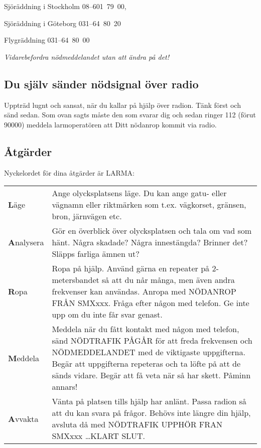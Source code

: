 Sjöräddning i Stockholm 08--601~79~00,

Sjöräddning i Göteborg 031--64~80~20

Flygräddning 031--64~80~00

\emph{Vidarebefordra nödmeddelandet utan att ändra på det!}

\subsection{Du själv sänder nödsignal över radio}

Uppträd lugnt och sansat, när du kallar på hjälp över radion. Tänk först och
sänd sedan. Som ovan sagts måste den som svarar dig och sedan ringer 112 (förut
90000) meddela larmoperatören att Ditt nödanrop kommit via radio.

\subsection{Åtgärder}

Nyckelordet för dina åtgärder är LARMA:

\begin{tabular}{lp{5cm}}
  \textbf{L}äge &
  Ange olycksplatsens läge. Du kan ange gatu- eller vägnamn eller riktmärken som
  t.ex. vägkorset, gränsen, bron, järnvägen etc.
  \\
  \textbf{A}nalysera
  &
  Gör en överblick över
  olycksplatsen och tala om vad som hänt.  Några skadade? Några innestängda?
  Brinner det? Släpps farliga ämnen ut?
  \\
  \textbf{R}opa &
  Ropa på hjälp. Använd gärna en repeater på 2-metersbandet så att du når många,
  men även andra frekvenser kan användas.  Anropa med NÖDANROP FRÅN SMXxxx. Fråga
  efter någon med telefon. Ge inte upp om du inte får svar genast.
  \\
  \textbf{M}eddela &
  Meddela när du fått kontakt med någon med telefon, sänd NÖDTRAFIK PÅGÅR för att
  freda frekvensen och NÖDMEDDELANDET med de viktigaste uppgifterna. Begär att
  uppgifterna repeteras och ta löfte på att de sänds vidare. Begär att få veta när
  så har skett. Påminn annars!
  \\
  \textbf{A}vvakta
  &
  Vänta på platsen tills hjälp har
  anlänt. Passa radion så att du kan svara på frågor. Behövs inte längre din
  hjälp, avsluta då med NÖDTRAFIK UPPHÖR FRAN SMXxxx \dots KLART SLUT.
\end{tabular}

